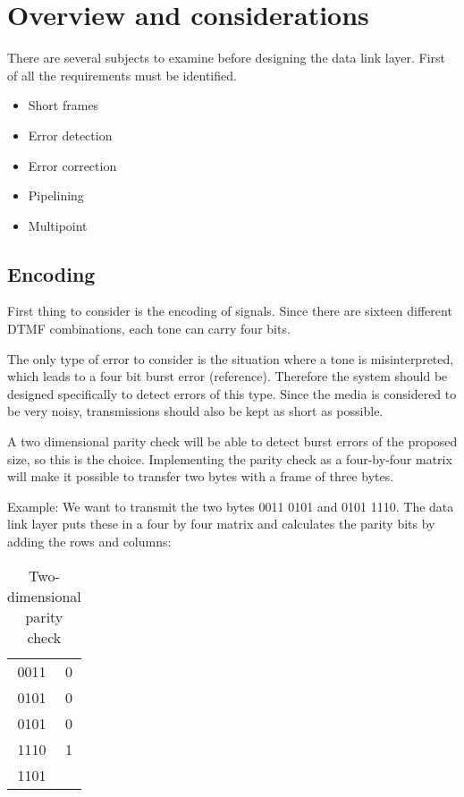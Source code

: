 \section{Overview and considerations}\label{sec:dll_theory}

There are several subjects to examine before designing the data link layer.
First of all the requirements must be identified. 
\begin{itemize}
	\item Short frames
	\item Error detection
	\item Error correction
	\item Pipelining
	\item Multipoint
\end{itemize}

\subsection{Encoding}
First thing to consider is the encoding of signals. Since there are sixteen
different DTMF combinations, each tone can carry four bits.

The only type of error to consider is the situation where a tone is
misinterpreted, which leads to a four bit burst error (reference). Therefore the
system should be designed specifically to detect errors of this type. Since the media
is considered to be very noisy, transmissions should also be kept as short as
possible.

A two dimensional parity check will be able to detect burst errors of the
proposed size, so this is the choice. Implementing the parity check as a
four-by-four matrix will make it possible to transfer two bytes with a frame of
three bytes.

Example: We want to transmit the two bytes 0011 0101 and 0101 1110. The data
link layer puts these in a four by four matrix and calculates the parity bits by
adding the rows and columns:

\begin{table}[htb]
	\centering
	\begin{tabular}{c|c}
	0011 & 0 \\
	0101 & 0 \\
	0101 & 0 \\
	1110 & 1 \\
	\hline
	1101 & \\
	\end{tabular}
	\caption{Two-dimensional parity check}
	\label{tab:two_dimensional_parity_check}
\end{table}


